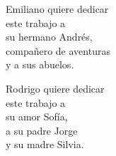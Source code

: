 
\begin{dedication} 

Emiliano quiere dedicar \\ 
este trabajo a \\
su hermano Andr\'es, \\
compa\~nero de aventuras \\
y a sus abuelos. 

\vspace{1cm}

Rodrigo quiere dedicar \\ 
este trabajo a \\
su amor Sof\'ia,\\ 
a su padre Jorge\\ 
y su madre Silvia. 


\end{dedication}

